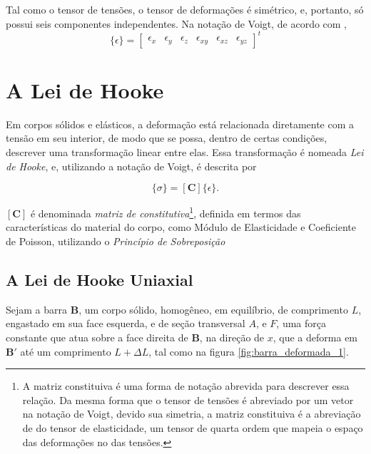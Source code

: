Tal como o tensor de tensões, o tensor de deformações é simétrico, e, portanto, só possui seis componentes independentes. Na notação de Voigt, de acordo com ,
\begin{equation}
    \{\epsilon\} = \begin{bmatrix}
        \epsilon_x & \epsilon_y & \epsilon_z & \epsilon_{xy} & \epsilon_{xz} & \epsilon_{yz}
    \end{bmatrix}^t
\end{equation}

\section{A Lei de Hooke}

Em corpos sólidos e elásticos, a deformação está relacionada diretamente com a tensão em seu interior, de modo que se possa, dentro de certas condições, descrever uma transformação linear entre elas. Essa transformação é nomeada \emph{Lei de Hooke}, e, utilizando a notação de Voigt, é descrita por

\begin{equation}
    \{\sigma\} = [\bm{C}] \{\epsilon\}.
\end{equation}

$[\bm{C}]$ é denominada \emph{matriz de constitutiva}\footnote{A matriz constituiva é uma forma de notação abrevida para descrever essa relação. Da mesma forma que o tensor de tensões é abreviado por um vetor na notação de Voigt, devido sua simetria, a matriz constituiva é a abreviação de do tensor de elasticidade, um tensor de quarta ordem que mapeia o espaço das deformações no das tensões.}, definida em termos das características do material do corpo, como Módulo de Elasticidade e Coeficiente de Poisson, utilizando o \emph{Princípio de Sobreposição}

\subsection{A Lei de Hooke Uniaxial}

Sejam a barra $\bm{B}$, um corpo sólido, homogêneo, em equilíbrio, de comprimento $L$, engastado em sua face esquerda, e de seção transversal $A$, e $F$, uma força constante que atua sobre a face direita de $\bm{B}$, na direção de $x$, que a deforma em $\bm{B}'$ até um comprimento $L+\Delta L$, tal como na figura \ref{fig:barra_deformada_1}. 




